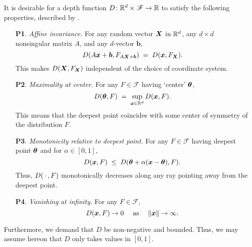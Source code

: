 
It is desirable for a depth function $D\colon \mathbb{R}^d \times \mathscr{F} \to \mathbb{R}$
to satisfy the following properties, described by
\textcite{zuo-serfling-2000}.

\begin{enumerate}
    \item[\textbf{P1}.] \emph{Affine invariance.}
        For any random vector $\bm{X}$ in $\mathbb{R}^d$, any $d \times d$ nonsingular
        matrix $A$, and any $d$-vector $\bm{b}$,
        \begin{equation}
            D(A\bm{x} + \bm{b}, F_{A\bm{X} + \bm{b}}) \;=\; D(\bm{x}, F_{\bm{X}}).
        \end{equation}
        This makes $D(\bm{X}, F_{\bm{X}})$ independent of the choice of coordinate
        system.

    \item[\textbf{P2}.] \emph{Maximality at center.}
        For any $F \in \mathscr{F}$ having `center' $\bm{\theta}$,
        \begin{equation}
            D(\bm{\theta}, F) \;=\; \sup_{\bm{x} \in \mathbb{R}^d} D(\bm{x}, F).
        \end{equation}
        This means that the deepest point coincides with some center of
        symmetry of the distribution $F$.

    \item[\textbf{P3}.] \emph{Monotonicity relative to deepest point.}
        For any $F \in \mathscr{F}$ having deepest point $\bm{\theta}$ and for
        $\alpha \in [0, 1]$,
        \begin{equation}
            D(\bm{x}, F) \;\leq\; D(\bm{\theta} + \alpha(\bm{x} - \bm{\theta}), F).
        \end{equation}
        Thus, $D(\,\cdot\,, F)$ monotonically decreases along any ray pointing
        away from the deepest point.

    \item[\textbf{P4}.] \emph{Vanishing at infinity.}
        For any $F \in \mathscr{F}$,
        \begin{equation}
            D(\bm{x}, F) \to 0 \quad\text{ as }\quad\Vert \bm{x} \Vert \to \infty.
        \end{equation}
\end{enumerate}

Furthermore, we demand that $D$ be non-negative and bounded.
Thus, we may assume hereon that $D$ only takes values in $[0, 1]$.

